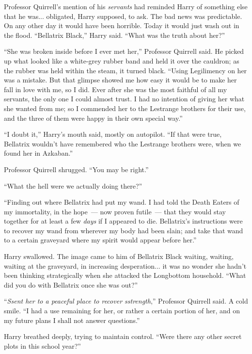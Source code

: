 Professor Quirrell's mention of his \emph{servants} had reminded Harry of something else that he was... obligated, Harry supposed, to ask. The bad news was predictable. On any other day it would have been horrible. Today it would just wash out in the flood. ``Bellatrix Black,'' Harry said. ``What was the truth about her?''

``She was broken inside before I ever met her,'' Professor Quirrell said. He picked up what looked like a white-grey rubber band and held it over the cauldron; as the rubber was held within the steam, it turned black. ``Using Legilimency on her was a mistake. But that glimpse showed me how easy it would be to make her fall in love with me, so I did. Ever after she was the most faithful of all my servants, the only one I could almost trust. I had no intention of giving her what she wanted from me; so I commended her to the Lestrange brothers for their use, and the three of them were happy in their own special way.''

``I doubt it,'' Harry's mouth said, mostly on autopilot. ``If that were true, Bellatrix wouldn't have remembered who the Lestrange brothers were, when we found her in Azkaban.''

Professor Quirrell shrugged. ``You may be right.''

``What the hell were we actually doing there?''

``Finding out where Bellatrix had put my wand. I had told the Death Eaters of my immortality, in the hope~--- now proven futile~--- that they would stay together for at least a few \emph{days} if I appeared to die. Bellatrix's instructions were to recover my wand from wherever my body had been slain; and take that wand to a certain graveyard where my spirit would appear before her.''

Harry swallowed. The image came to him of Bellatrix Black waiting, waiting, waiting at the graveyard, in increasing desperation... it was no wonder she hadn't been thinking strategically when she attacked the Longbottom household. ``What did you do with Bellatrix once she was out?''

``\emph{Ssent her to a peaceful place to recover sstrength},'' Professor Quirrell said. A cold smile. ``I had a use remaining for her, or rather a certain portion of her, and on my future plans I shall not answer questions.''

Harry breathed deeply, trying to maintain control. ``Were there any other secret plots in this school year?''


